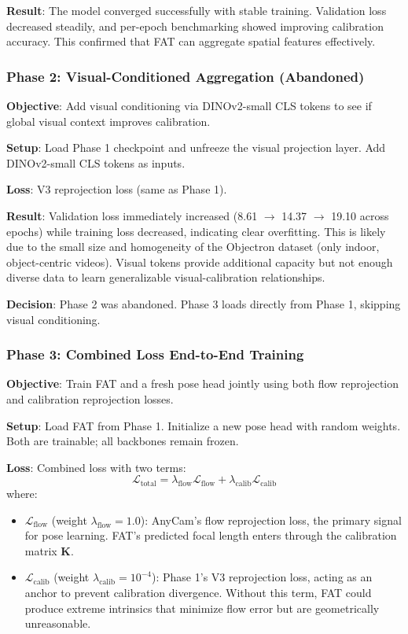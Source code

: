 \textbf{Result}: The model converged successfully with stable training. Validation loss decreased steadily, and per-epoch benchmarking showed improving calibration accuracy. This confirmed that FAT can aggregate spatial features effectively.

\subsubsection{Phase 2: Visual-Conditioned Aggregation (Abandoned)}

\textbf{Objective}: Add visual conditioning via DINOv2-small CLS tokens to see if global visual context improves calibration.

\textbf{Setup}: Load Phase 1 checkpoint and unfreeze the visual projection layer. Add DINOv2-small CLS tokens as inputs.

\textbf{Loss}: V3 reprojection loss (same as Phase 1).

\textbf{Result}: Validation loss immediately increased (8.61 $\to$ 14.37 $\to$ 19.10 across epochs) while training loss decreased, indicating clear overfitting. This is likely due to the small size and homogeneity of the Objectron dataset (only indoor, object-centric videos). Visual tokens provide additional capacity but not enough diverse data to learn generalizable visual-calibration relationships.

\textbf{Decision}: Phase 2 was abandoned. Phase 3 loads directly from Phase 1, skipping visual conditioning.

\subsubsection{Phase 3: Combined Loss End-to-End Training}

\textbf{Objective}: Train FAT and a fresh pose head jointly using both flow reprojection and calibration reprojection losses.

\textbf{Setup}: Load FAT from Phase 1. Initialize a new pose head with random weights. Both are trainable; all backbones remain frozen.

\textbf{Loss}: Combined loss with two terms:
\begin{equation}
    \mathcal{L}_{\text{total}} = \lambda_{\text{flow}} \mathcal{L}_{\text{flow}} + \lambda_{\text{calib}} \mathcal{L}_{\text{calib}}
\end{equation}
where:
\begin{itemize}
    \item $\mathcal{L}_{\text{flow}}$ (weight $\lambda_{\text{flow}} = 1.0$): AnyCam's flow reprojection loss, the primary signal for pose learning. FAT's predicted focal length enters through the calibration matrix $\mathbf{K}$.
    \item $\mathcal{L}_{\text{calib}}$ (weight $\lambda_{\text{calib}} = 10^{-4}$): Phase 1's V3 reprojection loss, acting as an anchor to prevent calibration divergence. Without this term, FAT could produce extreme intrinsics that minimize flow error but are geometrically unreasonable.
\end{itemize}

